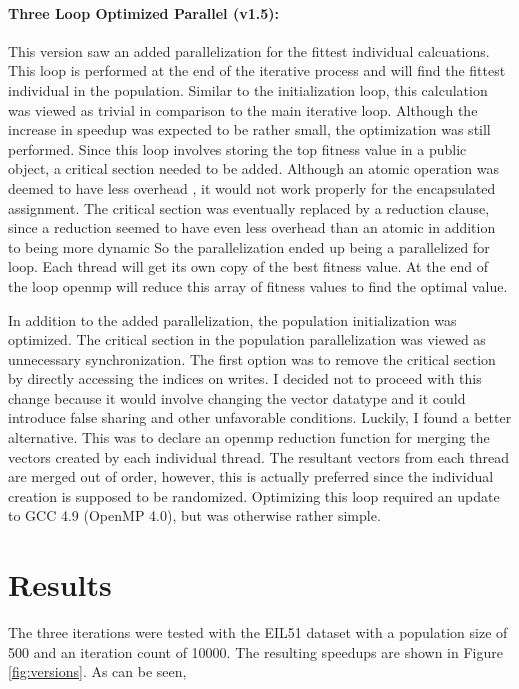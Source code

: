 \documentclass[10pt,letterpaper]{article}
\begin{document}
\paragraph{Three Loop Optimized Parallel (v1.5): } This version saw an added parallelization for the fittest individual calcuations. This loop is performed at the end of the iterative process and will find the fittest individual in the population. Similar to the initialization loop, this calculation was viewed as trivial in comparison to the main iterative loop. Although the increase in speedup was expected to be rather small, the optimization was still performed. Since this loop involves storing the top fitness value in a public object, a critical section needed to be added. Although an atomic operation was deemed to have less overhead \cite{atomicoverhead}, it would not work properly for the encapsulated assignment. The critical section was eventually replaced by a reduction clause, since a reduction seemed to have even less overhead than an atomic in addition to being more dynamic %
So the parallelization ended up being a parallelized for loop. Each thread will get its own copy of the best fitness value. At the end of the loop openmp will reduce this array of fitness values to find the optimal value.
 
In addition to the added parallelization, the population initialization was optimized. The critical section in the population parallelization was viewed as unnecessary synchronization. The first option was to remove the critical section by directly accessing the indices on writes. I decided not to proceed with this change because it would involve changing the vector datatype and it could introduce false sharing and other unfavorable conditions. Luckily, I found a better alternative. This was to declare an openmp reduction function for merging the vectors created by each individual thread. The resultant vectors from each thread are merged out of order, however, this is actually preferred since the individual creation is supposed to be randomized. Optimizing this loop required an update to GCC 4.9 (OpenMP 4.0), but was otherwise rather simple.

\section{Results} \label{sec:results}
The three iterations were tested with the EIL51 dataset with a population size of 500 and an iteration count of 10000. The resulting speedups are shown in Figure \ref{fig:versions}. As can be seen, %
\end{document}
